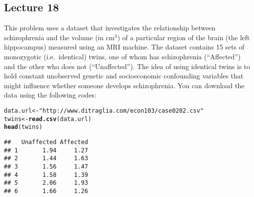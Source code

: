 \documentclass[addpoints,12pt]{exam}\usepackage[]{graphicx}\usepackage[]{color}
\makeatletter
\newcommand{\hlstr}[1]{\textcolor[rgb]{0.192,0.494,0.8}{#1}}%
\newcommand{\hlstd}[1]{\textcolor[rgb]{0.345,0.345,0.345}{#1}}%
\newcommand{\hlkwb}[1]{\textcolor[rgb]{0.69,0.353,0.396}{#1}}%
\newcommand{\hlkwd}[1]{\textcolor[rgb]{0.737,0.353,0.396}{\textbf{#1}}}%
\newenvironment{kframe}{%
 \def\at@end@of@kframe{}%
 \ifinner\ifhmode%
  \def\at@end@of@kframe{\end{minipage}}%
  \begin{minipage}{\columnwidth}%
 \fi\fi%
 \def\FrameCommand##1{\hskip\@totalleftmargin \hskip-\fboxsep
 \colorbox{shadecolor}{##1}\hskip-\fboxsep
     \hskip-\linewidth \hskip-\@totalleftmargin \hskip\columnwidth}%
 \MakeFramed {\advance\hsize-\width
   \@totalleftmargin\z@ \linewidth\hsize
   \@setminipage}}%
 {\par\unskip\endMakeFramed%
 \at@end@of@kframe}
\newenvironment{knitrout}{}{} %
\makeatother
\begin{document}
\begin{questions}
\section*{Lecture 18}


\question This problem uses a dataset that investigates the relationship between schizophrenia and the volume (in cm$^3$) of a particular region of the brain (the left hippocampus) measured using an MRI machine. The dataset contains 15 sets of monozygotic (i.e.\ identical) twins, one of whom has schizophrenia (``Affected'') and the other who does not (``Unaffected''). The idea of using identical twins is to hold constant unobserved genetic and socioeconomic confounding variables that might influence whether someone develops schizophrenia. You can download the data using the following codes:
\begin{knitrout}
\color{fgcolor}\begin{kframe}
\begin{alltt}
\hlstd{data.url} \hlkwb{<-} \hlstr{"http://www.ditraglia.com/econ103/case0202.csv"}
\hlstd{twins} \hlkwb{<-} \hlkwd{read.csv}\hlstd{(data.url)}
\hlkwd{head}\hlstd{(twins)}
\end{alltt}
\begin{verbatim}
##   Unaffected Affected
## 1       1.94     1.27
## 2       1.44     1.63
## 3       1.56     1.47
## 4       1.58     1.39
## 5       2.06     1.93
## 6       1.66     1.26
\end{verbatim}
\end{kframe}
\end{knitrout}
\end{questions}
\end{document}
